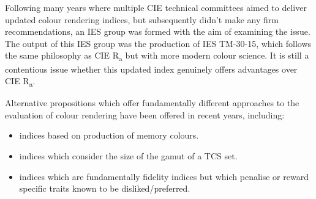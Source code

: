Following many years where multiple CIE technical committees aimed to deliver updated colour rendering indices, but subsequently didn't make any firm recommendations, an IES group was formed with the aim of examining the issue. The output of this IES group was the production of IES TM-30-15\cite{color_metric_task_group_of_the_ies_ies_2015}, which follows the same philosophy as CIE R\textsubscript{a} but with more modern colour science. It is still a contentious issue whether this updated index genuinely offers advantages over CIE R\textsubscript{a}. 

Alternative propositions which offer fundamentally different approaches to the evaluation of colour rendering have been offered in recent years, including: 
\begin{itemize}
\item indices based on production of memory colours\citep{smet_memory_2012}.
\item indices which consider the size of the gamut of a TCS set\citep{rea_color_2008,teunissen_characterising_2016}.
\item indices which are fundamentally fidelity indices but which penalise or reward specific traits known to be disliked/preferred\citep{ohno_rationale_2010}.
\end{itemize}


